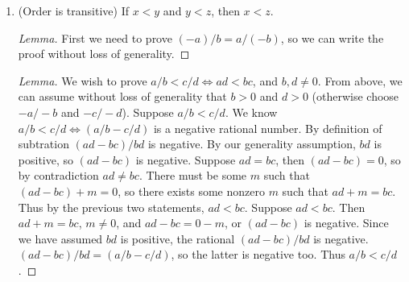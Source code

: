 \documentclass[../../main.tex]{subfiles}
\begin{document}
\begin{enumerate}
\begin{proof}
        Suppose $y > x$. 
        Then $y-x$ is positive, i.e.
        $(cb - da) / db$ is positive.
        Then $(cb - da)$ and $(db)$ are both positive integers.
        If $(cb - da)$ is positive, its negation $-(cb - da)$ is negative.
        We know $-(cb - da) = (ad - bc)$ by negation and commutativity.
        Then $(ad - bc) / db$ is a negative rational. 
        Then so is $(x-y)$.
        Thus, $x < y$.
    \end{proof}
    \item 
    \begin{q}
        (Order is transitive) If $x < y$ and $y < z$, then $x < z$.
    \end{q}
    \begin{proof}[Lemma]
        First we need to prove $(-a)/b = a/(-b)$, so we can write the proof without loss of generality.
    \end{proof}
    \begin{proof}[Lemma]
        We wish to prove $a/b < c/d \iff ad < bc$, and $b, d \neq 0$.
        From above, we can assume without loss of generality that $b > 0$ and $d > 0$ (otherwise choose $-a/-b$ and $-c/-d$). 
        Suppose $a/b < c/d$.
        We know $a/b < c/d \iff (a/b - c/d)$ is a negative rational number.
        By definition of subtration $(ad - bc) / bd$ is negative. 
        By our generality assumption, $bd$ is positive, so $(ad-bc)$ is negative.
        Suppose $ad = bc$, then $(ad - bc) = 0$, so by contradiction $ad \neq bc$. 
        There must be some $m$ such that $(ad - bc) + m = 0$, 
        so there exists some nonzero $m$ such that $ad+m=bc$.
        Thus by the previous two statements, $ad < bc$.
        Suppose $ad < bc$.
        Then $ad+m=bc$, $m \neq 0$, and $ad - bc = 0 - m$, or $(ad-bc)$ is negative. 
        Since we have assumed $bd$ is positive, the rational $(ad - bc) / bd$ is negative. 
        $(ad - bc) / bd = (a/b - c/d)$, so the latter is negative too.
        Thus $a/b < c/d$.
        

\end{proof}
\end{enumerate}
\end{document}

